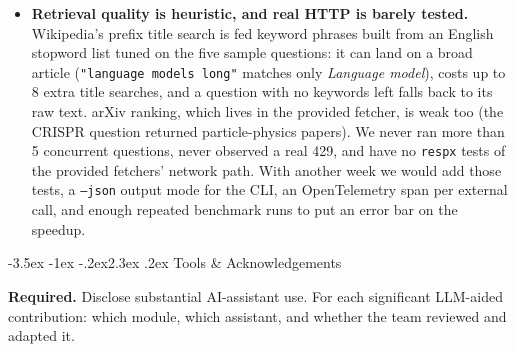 \documentclass[11pt,a4paper]{article}
\makeatletter
\renewcommand\section{\@startsection{section}{1}{\z@}%
    {-3.5ex \@plus -1ex \@minus -.2ex}{2.3ex \@plus .2ex}%
    {\normalfont\Large\bfseries\color{accent}}}%
\makeatother
\begin{document}
\begin{itemize}[leftmargin=1.4em,itemsep=3pt]
  \item \textbf{Retrieval quality is heuristic, and real HTTP is barely tested.} Wikipedia's prefix title search is fed keyword phrases built from an English stopword list tuned on the five sample questions: it can land on a broad article (\texttt{"language models long"} matches only \emph{Language model}), costs up to 8 extra title searches, and a question with no keywords left falls back to its raw text. arXiv ranking, which lives in the provided fetcher, is weak too (the CRISPR question returned particle-physics papers). We never ran more than 5 concurrent questions, never observed a real 429, and have no \texttt{respx} tests of the provided fetchers' network path. With another week we would add those tests, a \texttt{--json} output mode for the CLI, an OpenTelemetry span per external call, and enough repeated benchmark runs to put an error bar on the speedup.
\end{itemize}

\section{Tools \& Acknowledgements}\label{sec:tools}

\begin{deliverbox}
\textbf{Required.} Disclose substantial AI-assistant use. For each significant LLM-aided contribution: which module, which assistant, and whether the team reviewed and adapted it.
\end{deliverbox}
\end{document}
